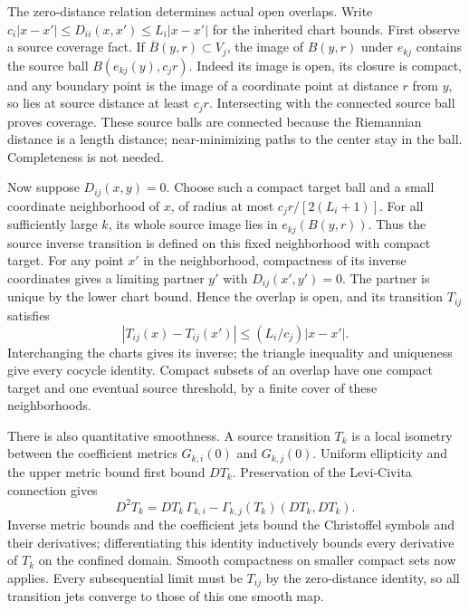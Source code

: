 The zero-distance relation determines actual open overlaps.  Write
$c_i|x-x'|\leq D_{ii}(x,x')\leq L_i|x-x'|$ for the inherited
chart bounds.  First observe a source coverage fact.  If
$\overline B(y,r)\subset V_j$, the image of $B(y,r)$ under
$e_{kj}$ contains the source ball $B(e_{kj}(y),c_jr)$.
Indeed its image is open, its closure is compact, and any boundary
point is the image of a coordinate point at distance $r$ from $y$,
so lies at source distance at least $c_jr$.  Intersecting with the
connected source ball proves coverage.  These source balls are
connected because the Riemannian distance is a length distance;
near-minimizing paths to the center stay in the ball.  Completeness
is not needed.

Now suppose $D_{ij}(x,y)=0$.  Choose such a compact target ball and
a small coordinate neighborhood of $x$, of radius at most
$c_jr/[2(L_i+1)]$.  For all sufficiently large $k$, its whole
source image lies in $e_{kj}(B(y,r))$.  Thus the source inverse
transition is defined on this fixed neighborhood with compact target.
For any point $x'$ in the neighborhood, compactness of its inverse
coordinates gives a limiting partner $y'$ with $D_{ij}(x',y')=0$.
The partner is unique by the lower chart bound.  Hence the overlap
is open, and its transition $T_{ij}$ satisfies
\[
 |T_{ij}(x)-T_{ij}(x')|\leq (L_i/c_j)|x-x'|.
\]
Interchanging the charts gives its inverse; the triangle inequality
and uniqueness give every cocycle identity.  Compact subsets of an
overlap have one compact target and one eventual source threshold,
by a finite cover of these neighborhoods.

There is also quantitative smoothness.  A source transition $T_k$
is a local isometry between the coefficient metrics $G_{k,i}(0)$
and $G_{k,j}(0)$.  Uniform ellipticity and the upper metric bound
first bound $DT_k$.  Preservation of the Levi-Civita connection gives
\[
 D^2T_k=DT_k\,\Gamma_{k,i}
       -\Gamma_{k,j}(T_k)(DT_k,DT_k).
\]
Inverse metric bounds and the coefficient jets bound the Christoffel
symbols and their derivatives; differentiating this identity
inductively bounds every derivative of $T_k$ on the confined domain.
Smooth compactness on smaller compact sets now applies.  Every
subsequential limit must be $T_{ij}$ by the zero-distance identity,
so all transition jets converge to those of this one smooth map.

